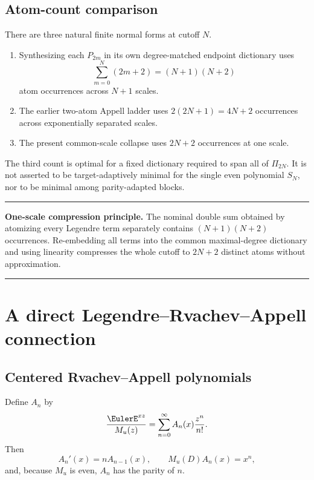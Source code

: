 \documentclass[11pt,oneside]{article}
\theoremstyle{definition}
\theoremstyle{remark}
\newenvironment{resultbox}{%
  \par\smallskip\noindent\begin{center}\begin{minipage}{0.94\textwidth}%
  \hrule\vspace{0.55em}\small
}{%
  \vspace{0.55em}\hrule\end{minipage}\end{center}\smallskip
}
\begin{document}
\subsection{Atom-count comparison}
There are three natural finite normal forms at cutoff $N$.
\begin{enumerate}
\item Synthesizing each $P_{2m}$ in its own degree-matched endpoint dictionary
uses
\begin{equation}
 \sum_{m=0}^{N}(2m+2)=(N+1)(N+2)
 \label{eq:separate-count}
\end{equation}
atom occurrences across $N+1$ scales.
\item The earlier two-atom Appell ladder uses $2(2N+1)=4N+2$ occurrences
across exponentially separated scales.
\item The present common-scale collapse uses $2N+2$ occurrences at one scale.
\end{enumerate}
The third count is optimal for a fixed dictionary required to span all of
$\Pi_{2N}$.  It is not asserted to be target-adaptively minimal for the
single even polynomial $S_N$, nor to be minimal among parity-adapted blocks.

\begin{resultbox}
\textbf{One-scale compression principle.}
The nominal double sum obtained by atomizing every Legendre term separately
contains $(N+1)(N+2)$ occurrences.  Re-embedding all terms into the common
maximal-degree dictionary and using linearity compresses the whole cutoff to
$2N+2$ distinct atoms without approximation.
\end{resultbox}

\section{A direct Legendre--Rvachev--Appell connection}
\label{sec:appell-connection}

\subsection{Centered Rvachev--Appell polynomials}
Define $A_n$ by
\begin{equation}
 \frac{\EulerE^{xz}}{M_u(z)}=\sum_{n=0}^{\infty}A_n(x)\frac{z^n}{n!}.
 \label{eq:Appell-egf}
\end{equation}
Then
\begin{equation}
 A_n'(x)=nA_{n-1}(x),
 \qquad
 M_u(D)A_n(x)=x^n,
 \label{eq:Appell-inverse}
\end{equation}
and, because $M_u$ is even, $A_n$ has the parity of $n$.
\end{document}
